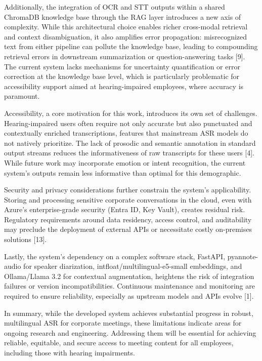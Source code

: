 \documentclass[12pt,a4paper]{article}
\begin{document}
Additionally, the integration of OCR and STT outputs within a shared ChromaDB knowledge base through the RAG layer introduces a new axis of complexity. While this architectural choice enables richer cross-modal retrieval and context disambiguation, it also amplifies error propagation: misrecognized text from either pipeline can pollute the knowledge base, leading to compounding retrieval errors in downstream summarization or question-answering tasks [9]. The current system lacks mechanisms for uncertainty quantification or error correction at the knowledge base level, which is particularly problematic for accessibility support aimed at hearing-impaired employees, where accuracy is paramount.


Accessibility, a core motivation for this work, introduces its own set of challenges. Hearing-impaired users often require not only accurate but also punctuated and contextually enriched transcriptions, features that mainstream ASR models do not natively prioritize. The lack of prosodic and semantic annotation in standard output streams reduces the informativeness of raw transcripts for these users [4]. While future work may incorporate emotion or intent recognition, the current system’s outputs remain less informative than optimal for this demographic.


Security and privacy considerations further constrain the system’s applicability. Storing and processing sensitive corporate conversations in the cloud, even with Azure’s enterprise-grade security (Entra ID, Key Vault), creates residual risk. Regulatory requirements around data residency, access control, and auditability may preclude the deployment of external APIs or necessitate costly on-premises solutions [13].


Lastly, the system’s dependency on a complex software stack, FastAPI, pyannote-audio for speaker diarization, intfloat/multilingual-e5-small embeddings, and Ollama/Llama 3.2 for contextual augmentation, heightens the risk of integration failures or version incompatibilities. Continuous maintenance and monitoring are required to ensure reliability, especially as upstream models and APIs evolve [1].


In summary, while the developed system achieves substantial progress in robust, multilingual ASR for corporate meetings, these limitations indicate areas for ongoing research and engineering. Addressing them will be essential for achieving reliable, equitable, and secure access to meeting content for all employees, including those with hearing impairments.
\end{document}
